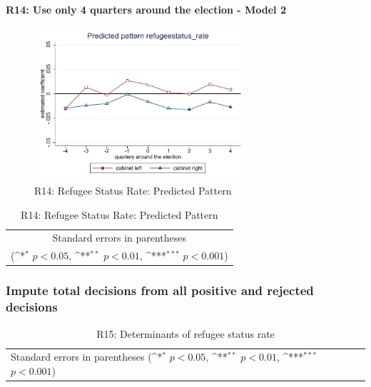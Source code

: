 \documentclass[10pt,a4paper]{scrartcl}
\begin{document}
\clearpage
\textbf{R14: Use only 4 quarters around the election - Model 2}
\begin{figure}[!ht]
	\centering
	\includegraphics[width=0.7\textwidth]{figures_edited/refugeestatus_rate_graph2_R14.pdf}
	\caption{R14: Refugee Status Rate: Predicted Pattern}
\end{figure}

\begin{table}[!ht]\centering
	\footnotesize
	\renewcommand{\arraystretch}{1.2}
	\def\sym#1{\ifmmode^{#1}\else\(^{#1}\)\fi}
	\caption{R14: Refugee Status Rate: Predicted Pattern}
	\begin{tabular}{l*{2}{c}}
		\hline\hline
		
		\hline\hline
		\multicolumn{3}{c}{\footnotesize Standard errors in parentheses} \\
		\multicolumn{3}{c}{\footnotesize (\sym{*} \(p<0.05\), \sym{**} \(p<0.01\), \sym{***} \(p<0.001\))} \\
	\end{tabular}
\end{table}





\clearpage
\FloatBarrier
\subsubsection{Impute total decisions from all positive and rejected decisions}
\begin{table}[!ht]\centering
	\renewcommand{\arraystretch}{1.25}
	\small
	\def\sym#1{\ifmmode^{#1}\else\(^{#1}\)\fi}
	\caption{R15: Determinants of refugee status rate}
	\begin{tabular}{l*{3}{c}}
		\hline\hline
		
		\hline\hline
		\multicolumn{4}{l}{\footnotesize Standard errors in parentheses (\sym{*} \(p<0.05\), \sym{**} \(p<0.01\), \sym{***} \(p<0.001\))}\\
	\end{tabular}
\end{table}
\end{document}
